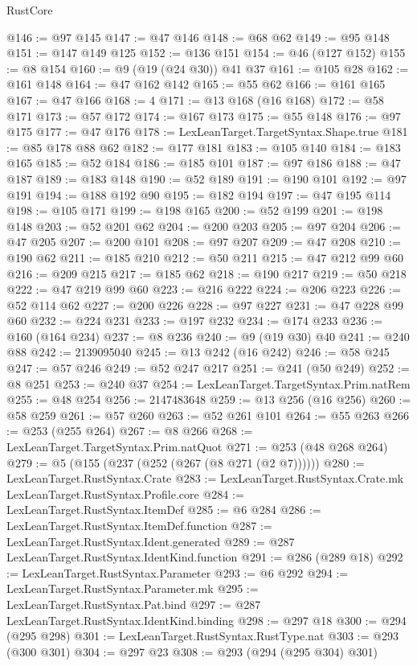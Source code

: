 \begin{lexlean}{RustCore}
\begin{coremodule}
@146 := @97 @145
@147 := @47 @146
@148 := @68 @62
@149 := @95 @148
@151 := @147 @149 @125
@152 := @136 @151
@154 := @46 (@127 @152)
@155 := @8 @154
@160 := @9 (@19 (@24 @30)) @41 @37
@161 := @105 @28
@162 := @161 @148
@164 := @47 @162 @142
@165 := @55 @62
@166 := @161 @165
@167 := @47 @166
@168 := 4
@171 := @13 @168 (@16 @168)
@172 := @58 @171
@173 := @57 @172
@174 := @167 @173
@175 := @55 @148
@176 := @97 @175
@177 := @47 @176
@178 := LexLeanTarget.TargetSyntax.Shape.true
@181 := @85 @178 @88 @62
@182 := @177 @181
@183 := @105 @140
@184 := @183 @165
@185 := @52 @184
@186 := @185 @101
@187 := @97 @186
@188 := @47 @187
@189 := @183 @148
@190 := @52 @189
@191 := @190 @101
@192 := @97 @191
@194 := @188 @192 @90
@195 := @182 @194
@197 := @47 @195 @114
@198 := @105 @171
@199 := @198 @165
@200 := @52 @199
@201 := @198 @148
@203 := @52 @201 @62
@204 := @200 @203
@205 := @97 @204
@206 := @47 @205
@207 := @200 @101
@208 := @97 @207
@209 := @47 @208
@210 := @190 @62
@211 := @185 @210
@212 := @50 @211
@215 := @47 @212 @99 @60
@216 := @209 @215
@217 := @185 @62
@218 := @190 @217
@219 := @50 @218
@222 := @47 @219 @99 @60
@223 := @216 @222
@224 := @206 @223
@226 := @52 @114 @62
@227 := @200 @226
@228 := @97 @227
@231 := @47 @228 @99 @60
@232 := @224 @231
@233 := @197 @232
@234 := @174 @233
@236 := @160 (@164 @234)
@237 := @8 @236
@240 := @9 (@19 @30) @40
@241 := @240 @88
@242 := 2139095040
@245 := @13 @242 (@16 @242)
@246 := @58 @245
@247 := @57 @246
@249 := @52 @247 @217
@251 := @241 (@50 @249)
@252 := @8 @251
@253 := @240 @37
@254 := LexLeanTarget.TargetSyntax.Prim.natRem
@255 := @48 @254
@256 := 2147483648
@259 := @13 @256 (@16 @256)
@260 := @58 @259
@261 := @57 @260
@263 := @52 @261 @101
@264 := @55 @263
@266 := @253 (@255 @264)
@267 := @8 @266
@268 := LexLeanTarget.TargetSyntax.Prim.natQuot
@271 := @253 (@48 @268 @264)
@279 := @5 (@155 (@237 (@252 (@267 (@8 @271 (@2 @7))))))
@280 := LexLeanTarget.RustSyntax.Crate
@283 := LexLeanTarget.RustSyntax.Crate.mk LexLeanTarget.RustSyntax.Profile.core
@284 := LexLeanTarget.RustSyntax.ItemDef
@285 := @6 @284
@286 := LexLeanTarget.RustSyntax.ItemDef.function
@287 := LexLeanTarget.RustSyntax.Ident.generated
@289 := @287 LexLeanTarget.RustSyntax.IdentKind.function
@291 := @286 (@289 @18)
@292 := LexLeanTarget.RustSyntax.Parameter
@293 := @6 @292
@294 := LexLeanTarget.RustSyntax.Parameter.mk
@295 := LexLeanTarget.RustSyntax.Pat.bind
@297 := @287 LexLeanTarget.RustSyntax.IdentKind.binding
@298 := @297 @18
@300 := @294 (@295 @298)
@301 := LexLeanTarget.RustSyntax.RustType.nat
@303 := @293 (@300 @301)
@304 := @297 @23
@308 := @293 (@294 (@295 @304) @301)

\end{coremodule}
\end{lexlean}
